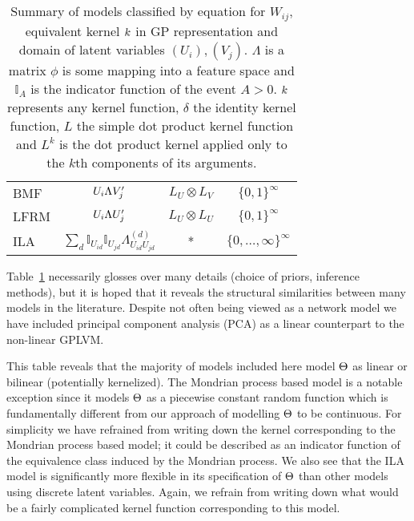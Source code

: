 \begin{table}[h]
\begin{tabular}{l|ccc}
    BMF  & $U_i\Lambda V_j'$ & $L_U \otimes L_V$ & $\{0,1\}^\infty$ \\%
    LFRM  & $U_i\Lambda U_j'$ & $L_U \otimes L_U$ & $\{0,1\}^\infty$ \\%
    ILA & $\sum_d \mathbb{I}_{U_{id}}\mathbb{I}_{U_{jd}}\Lambda^{(d)}_{U_{id}U_{jd}}$ & * & $\{0,\ldots,\infty\}^\infty$ \\%
\end{tabular}
\caption[Summary of models of arrays cast into Aldous--Hoover form.]{
Summary of models classified by equation for $W_{ij}$, equivalent kernel $k$ in GP representation and domain of latent variables $(U_i), (V_j)$.
$\Lambda$ is a matrix $\phi$ is some mapping into a feature space and $\mathbb{I}_A$ is the indicator function of the event $A>0$.
$k$ represents any kernel function, $\delta$ the identity kernel function, $L$ the simple dot product kernel function and $L^k$ is the dot product kernel applied only to the $k$th components of its arguments.
}
\label{table:ModelComparison}
\end{table}

Table~\ref{table:ModelComparison} necessarily glosses over many details (\eg choice of priors, inference methods), but it is hoped that it reveals the structural similarities between many models in the literature.
Despite not often being viewed as a network model we have included principal component analysis (PCA) as a linear counterpart to the non-linear GPLVM.

This table reveals that the majority of models included here model $\Theta$ as linear or bilinear (potentially kernelized).
The Mondrian process based model \citep{Roy2009-ge} is a notable exception since it models $\Theta$ as a piecewise constant random function which is fundamentally different from our approach of modelling $\Theta$ to be continuous.
For simplicity we have refrained from writing down the kernel corresponding to the Mondrian process based model; it could be described as an indicator function of the equivalence class induced by the Mondrian process.
We also see that the ILA model is significantly more flexible in its specification of $\Theta$ than other models using discrete latent variables.
Again, we refrain from writing down what would be a fairly complicated kernel function corresponding to this model.

